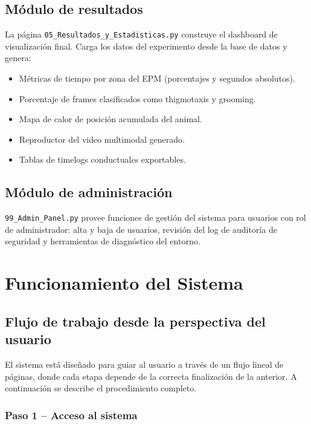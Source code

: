\documentclass[12pt]{report}
\begin{document}
\section{Módulo de resultados}

La página \texttt{05\_Resultados\_y\_Estadisticas.py} construye el dashboard
de visualización final. Carga los datos del experimento desde la base de datos
y genera:

\begin{itemize}[leftmargin=*]
    \item Métricas de tiempo por zona del EPM (porcentajes y segundos absolutos).
    \item Porcentaje de frames clasificados como thigmotaxis y grooming.
    \item Mapa de calor de posición acumulada del animal.
    \item Reproductor del video multimodal generado.
    \item Tablas de timelogs conductuales exportables.
\end{itemize}

\section{Módulo de administración}

\texttt{99\_Admin\_Panel.py} provee funciones de gestión del sistema para
usuarios con rol de administrador: alta y baja de usuarios, revisión del
log de auditoría de seguridad y herramientas de diagnóstico del entorno.

\chapter{Funcionamiento del Sistema}

\section{Flujo de trabajo desde la perspectiva del usuario}

El sistema está diseñado para guiar al usuario a través de un flujo lineal
de páginas, donde cada etapa depende de la correcta finalización de la anterior.
A continuación se describe el procedimiento completo.

\subsection{Paso 1 -- Acceso al sistema}
\end{document}

